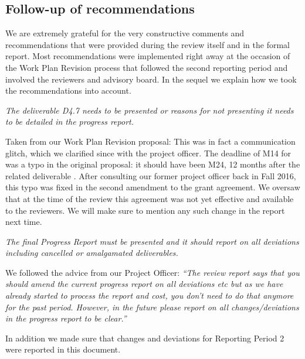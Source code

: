 \subsection{Follow-up of recommendations}

We are extremely grateful for the very constructive comments and
recommendations that were provided during the review itself and in the
formal report. Most recommendations were implemented right away at the
occasion of the Work Plan Revision process that followed the second
reporting period and involved the reviewers and advisory board. In the
sequel we explain how we took the recommendations into account.

\newenvironment{recommendation}[1]
{\noindent{\textbf{#1:}} \begingroup\it}
{\endgroup}

\begin{recommendation}{Recommendation 1} The deliverable D4.7 needs to
  be presented or reasons for not presenting it needs to be detailed
  in the progress report.
\end{recommendation}

Taken from our Work Plan Revision proposal:
This was in fact a communication glitch, which we clarified since with
the project officer. The deadline of M14 for
 was a typo in the original proposal: it
should have been M24, 12 months after the related deliverable
. After consulting our former
project officer back in Fall 2016, this typo was fixed in the second
amendment to the grant agreement. We oversaw that at the time of the
review this agreement was not yet effective and available to the
reviewers. We will make sure to mention any such change in the report
next time.

\begin{recommendation}{Recommendation 2} The final Progress Report
  must be presented and it should report on all deviations including
  cancelled or amalgamated deliverables.
\end{recommendation}

We followed the advice from our Project Officer: \emph{``The review
report says that you should amend the current progress report on all
deviations etc but as we have already started to process the report
and cost, you don’t need to do that anymore for the past period.
However, in the future please report on all changes/deviations in the
progress report to be clear.''}

In addition we made sure that changes and deviations for Reporting
Period 2 were reported in this document.

